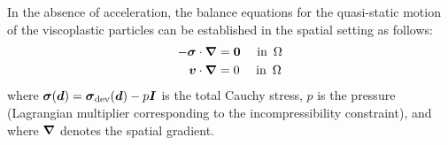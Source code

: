 \documentclass[10pt,a4paper]{article}
\begin{document}
In the absence of acceleration, the balance equations for the quasi-static motion of the viscoplastic particles can be established in the spatial setting as follows:
\begin{align}
    -\boldsymbol{\sigma}\cdot\boldsymbol{\nabla} & = \boldsymbol{0} \quad \mbox{ in }\,\Omega
\label{eq204a}
\\
    \boldsymbol{v}\cdot\boldsymbol{\nabla} & = 0 \quad \mbox{ in }\,\Omega
\label{eq204b}
\end{align}
where $\boldsymbol{\sigma}(\boldsymbol{d})=\boldsymbol{\sigma}_{\mathrm{dev}}(\boldsymbol{d})-p\boldsymbol{I}$ is the total Cauchy stress, $p$ is the pressure (Lagrangian multiplier corresponding to the incompressibility constraint), and
where $\boldsymbol{\nabla}$ denotes the spatial gradient.
\end{document}
